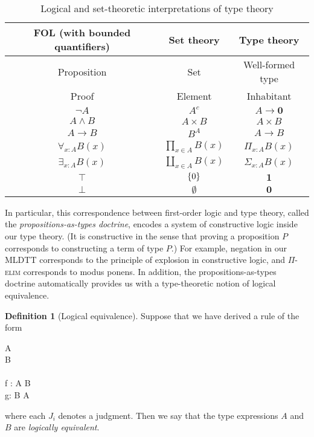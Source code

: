 \documentclass[10pt,letterpaper,cm]{nupset}
\theoremstyle{definition}
\newtheorem{definition}{Definition}[subsection]
\theoremstyle{theorem}
\theoremstyle{remark}
\newcommand{\0}{\mathbf{0}}
\newcommand{\1}{\mathbf{1}}
\newcommand{\2}{\mathbf{2}}
\DeclareMathOperator{\type}{\mathtt{type}}
\newcommand{\bmp}{\begin{mathpar}}
\newcommand{\emp}{\end{mathpar}}
\begin{document}
\begin{table}[h!]
\centering
\caption{Logical and set-theoretic interpretations of type theory}
\label{table:2}
\begin{tabular}{||c c c||} 
 \hline
 FOL (with bounded quantifiers) & Set theory & Type theory \\ [0.5ex] 
 \hline\hline
 Proposition &  Set & Well-formed type \\ 
   Proof        &  Element  & Inhabitant  \\
 $\neg{A}$ &  $A^c$  &   $A \to \0$ \\
 $A \land B$ & $A \times B$ & $A \times B$  \\ 
 $A \to B$ & $B^A$ &  $A \to B$  \\
 $\forall_{x:A}B(x)$ & $\prod_{x\in A}B(x)$ &  $\Pi_{x:A}B(x)$  \\
 $\exists_{x:A} B(x)$ & $\coprod_{x\in A}B(x)$ & $\Sigma_{x:A}B(x)$ \\ 
  $\top$    & $\mleft\{0\mright\}$    & $\1$ \\
  $\bot$    & $\emptyset$  & $\0$ \\ [1ex] 
 \hline
\end{tabular}
\end{table}

In particular, this correspondence between first-order logic and type theory, called the \textit{propositions-as-types doctrine}, encodes a system of constructive logic inside our  type theory. (It is constructive in the sense that proving a proposition $P$ corresponds to constructing a term of type $P$.) For example, negation in our MLDTT corresponds to the principle of explosion in constructive logic, and $\Pi$-\textsc{elim} corresponds to modus ponens. In addition, the propositions-as-types doctrine automatically provides us with a type-theoretic notion of logical equivalence.


\begin{definition}[Logical equivalence]
Suppose that we have derived  a rule of the form
\bmp 
{}
{\Gamma \vdash A \type \\ \Gamma  \vdash B \type \\\\ \Gamma \vdash  f : A \to B \\ \Gamma \vdash g: B \to A}
\emp where each $J_i$ denotes a judgment. 
 Then we say that the type expressions $A$ and $B$ are \textit{logically equivalent}. 
\end{definition}
\end{document}
